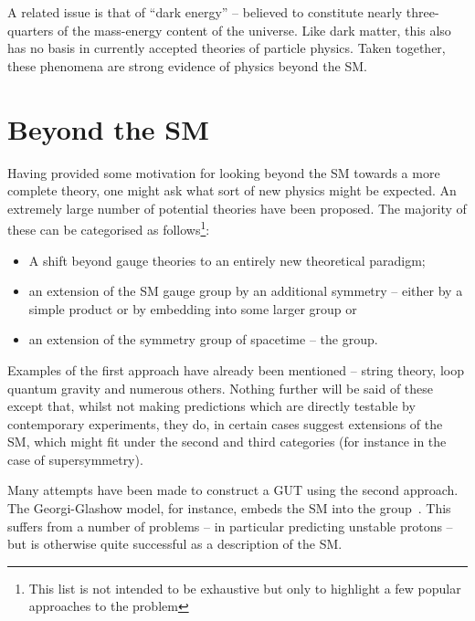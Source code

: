 A related issue is that of ``dark energy'' -- believed to constitute nearly
three-quarters of the mass-energy content of the universe. Like dark matter,
this also has no basis in currently accepted theories of particle physics. Taken
together, these phenomena are strong evidence of physics beyond the \ac{SM}.

\section{Beyond the \acl{SM}}
Having provided some motivation for looking beyond the \ac{SM} towards a more
complete theory, one might ask what sort of new physics might be expected. An
extremely large number of potential theories have been proposed. The majority of
these can be categorised as follows\footnote{This list is not intended to be
  exhaustive but only to highlight a few popular approaches to the problem}:
\begin{itemize}
\item A shift beyond gauge theories to an entirely new theoretical paradigm;
\item an extension of the \ac{SM} gauge group by an additional symmetry -- either
  by a simple product or by embedding into some larger group or
\item an extension of the symmetry group of spacetime -- the \Poincare group.
\end{itemize}

Examples of the first approach have already been mentioned -- string theory, loop
quantum gravity and numerous others. Nothing further will be said of these
except that, whilst not making predictions which are directly testable by
contemporary experiments, they do, in certain cases suggest extensions of the
\ac{SM}, which might fit under the second and third categories (for instance in
the case of supersymmetry).

Many attempts have been made to construct a \acl{GUT} using the second
approach. The Georgi-Glashow model, for instance, embeds the \ac{SM} into the
\SUfive group~\cite{georgi_glashow}. This suffers from a number of problems -- in
particular predicting unstable protons -- but is otherwise quite successful as a
description of the \ac{SM}.

